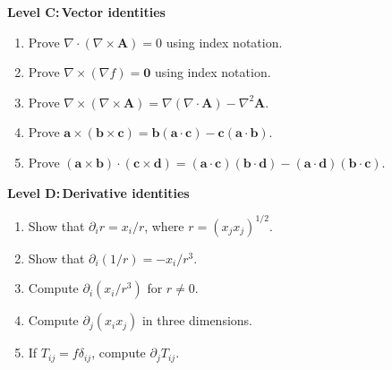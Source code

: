 \documentclass{otscience}
\begin{document}
\begin{practicebox}
    \textbf{Level C:\,Vector identities}
    \begin{enumerate}
        \item Prove \(\nabla\cdot(\nabla\times\mathbf{A})=0\) using index notation.
        \item Prove \(\nabla\times(\nabla f)=\mathbf{0}\) using index notation.
        \item Prove \(\nabla\times(\nabla\times\mathbf{A})=\nabla(\nabla\cdot\mathbf{A})-\nabla^2\mathbf{A}\).
        \item Prove \(\mathbf{a}\times(\mathbf{b}\times\mathbf{c})=\mathbf{b}(\mathbf{a}\cdot\mathbf{c})-\mathbf{c}(\mathbf{a}\cdot\mathbf{b})\).
        \item Prove \((\mathbf{a}\times\mathbf{b})\cdot(\mathbf{c}\times\mathbf{d})=(\mathbf{a}\cdot\mathbf{c})(\mathbf{b}\cdot\mathbf{d})-(\mathbf{a}\cdot\mathbf{d})(\mathbf{b}\cdot\mathbf{c})\).
    \end{enumerate}

    \textbf{Level D:\,Derivative identities}
    \begin{enumerate}
        \item Show that \(\partial_i r=x_i/r\), where \(r={(x_{j}x_j)}^{1/2}\).
        \item Show that \(\partial_i(1/r)=-x_i/r^3\).
        \item Compute \(\partial_i(x_i/r^3)\) for \(r\neq0\).
        \item Compute \(\partial_j(x_{i}x_j)\) in three dimensions.
        \item If \(T_{ij}=f\delta_{ij}\), compute \(\partial_{j}T_{ij}\).
    \end{enumerate}
\end{practicebox}

\ifdefined\OTCOMBINED%
\else
\end{document}
